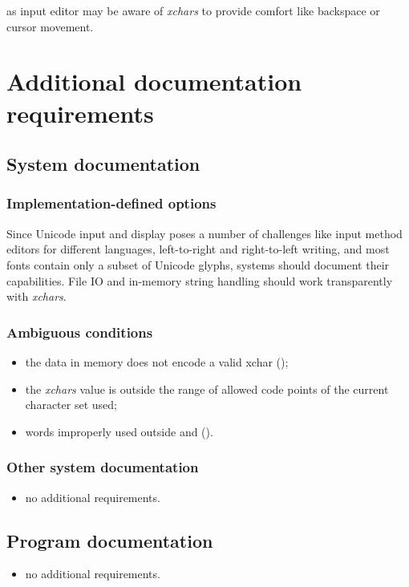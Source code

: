  as input editor may be aware of \emph{xchars} to
provide comfort like backspace or cursor movement.

\section{Additional documentation requirements} %

\subsection{System documentation} %

\subsubsection{Implementation-defined options} %
\label{xchar:impopt}

Since Unicode input and display poses a number of challenges like input
method editors for different languages, left-to-right and right-to-left
writing, and most fonts contain only a subset of Unicode glyphs,
systems should document their capabilities.  File IO and in-memory
string handling should work transparently with \emph{xchars}.

\subsubsection{Ambiguous conditions} %

\begin{itemize}
\item the data in memory does not encode a valid xchar
	();
\item the \emph{xchars} value is outside the range of allowed code points of
	the current character set used;
\item words improperly used outside
	 and 
	().
\end{itemize}

\subsubsection{Other system documentation} %
\begin{itemize}
\item no additional requirements.
\end{itemize}

\subsection{Program documentation} %
\begin{itemize}
\item no additional requirements.
\end{itemize}

